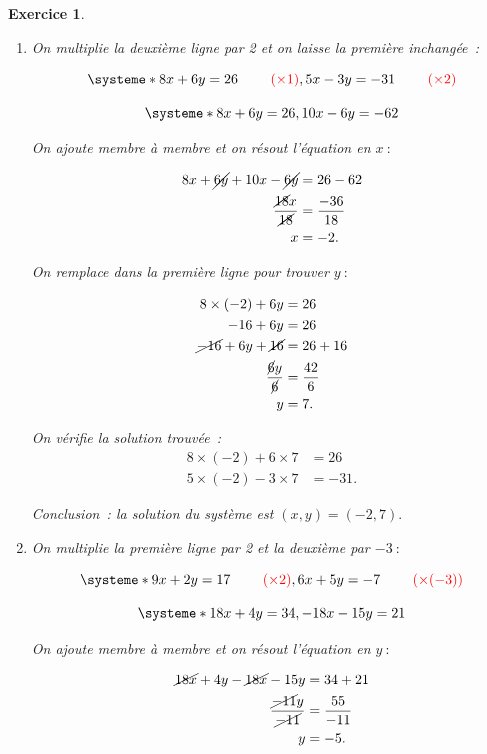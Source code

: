 \documentclass[10pt]{article}
\newtheorem{exo}{Exercice}
\begin{document}
\begin{exo}

\begin{enumerate}
\item 

On multiplie la deuxième ligne par 2 et on laisse la première inchangée~:

\[
\systeme*{8x+6y=26\qquad\textcolor{red}{~(\times 1)},5x-3y=-31\qquad\textcolor{red}{~(\times 2)}}
\]

\[
\systeme*{8x+6y=26,10x-6y=-62}
\]

On ajoute membre à membre et on résout l'équation en $x~:$

\begin{align*}8x+\cancel{6y}+10x-\cancel{6y}&=26-62\\
\frac{\cancel{18}x}{\cancel{18}}&=\frac{-36}{18}\\
x&=-2.\end{align*}

On remplace dans la première ligne pour trouver $y~:$

\begin{align*}
8\times (-2)+6y&=26\\
-16+6y&=26\\
\cancel{-16}+6y+\cancel{16}&=26+16\\
\frac{\cancel{6}y}{\cancel{6}}&=\frac{42}{6}\\
y&=7.\end{align*}

On vérifie la solution trouvée~:
\begin{align*}8\times (-2)+6\times 7&=26\\5\times (-2)-3\times 7&=-31.\end{align*}


Conclusion~: la solution du système est $(x,y)=(-2,7).$
\item On multiplie la première ligne par 2 et la deuxième par $-3~:$

\[
\systeme*{9x+2y=17\qquad\textcolor{red}{~(\times 2)},6x+5y=-7\qquad\textcolor{red}{~(\times (-3))}}
\]

\[
\systeme*{18x+4y=34,-18x-15y=21}
\]

On ajoute membre à membre et on résout l'équation en $y~:$

\begin{align*}\cancel{18x}+4y-\cancel{18x}-15y&=34+21\\
\frac{\cancel{-11}y}{\cancel{-11}}&=\frac{55}{-11}\\
y&=-5.\end{align*}


\end{enumerate}
\end{exo}
\end{document}
